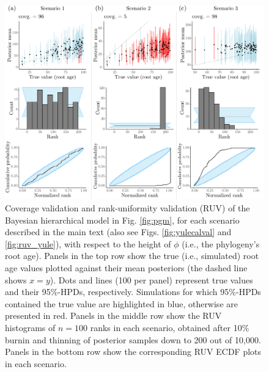 \documentclass[oneside]{article}
\begin{document}
\begin{figure}
  \centering
  \includegraphics[width=0.95\linewidth]{../figures/treeHeight_manual.pdf}
  \caption{
    Coverage validation and rank-uniformity validation (RUV) of the Bayesian hierarchical model in Fig. \ref{fig:pgm}, for each scenario described in the main text (also see Figs. \ref{fig:yulecalval} and \ref{fig:ruv_yule}), with respect to the height of $\phi$ (i.e., the phylogeny's root age).
    Panels in the top row show the true (i.e., simulated) root age values plotted against their mean posteriors (the dashed line shows $x = y$).
    Dots and lines (100 per panel) represent true values and their 95\%-HPDs, respectively.
    Simulations for which 95\%-HPDs contained the true value are highlighted in blue, otherwise are presented in red.
    Panels in the middle row show the RUV histograms of $n=100$ ranks in each scenario, obtained after 10\% burnin and thinning of posterior samples down to 200 out of 10,000.
    Panels in the bottom row show the corresponding RUV ECDF plots in each scenario.
  }
  \label{fig:treeheight}
\end{figure}
\end{document}
